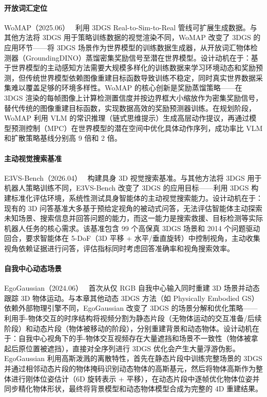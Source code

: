 \paragraph{开放词汇定位}

WoMAP（2025.06）~\cite{2506_01600} 利用 3DGS Real-to-Sim-to-Real 管线可扩展生成数据。与其他方法将 3DGS 用于策略训练数据的视觉渲染不同，WoMAP 改变了 3DGS 的应用环节——将 3DGS 场景作为世界模型的训练数据生成器，从开放词汇物体检测器（GroundingDINO）蒸馏密集奖励信号至潜在世界模型。设计动机在于：基于世界模型的主动感知方法需要大规模多样化的训练数据来学习环境动态和奖励预测，但传统世界模型依赖图像重建目标函数导致训练不稳定，同时真实世界数据采集难以覆盖足够的环境多样性。WoMAP 的核心创新是奖励蒸馏策略——在 3DGS 渲染的每帧图像上计算检测置信度并按边界框大小缩放作为密集奖励信号，替代传统的图像重建目标函数，实现数据高效的奖励预测器训练。在规划阶段，WoMAP 利用 VLM 的常识推理（链式思维提示）生成高层动作提议，再通过模型预测控制（MPC）在世界模型的潜在空间中优化具体动作序列，成功率比 VLM 和扩散策略基线分别高 9 倍和 2 倍。

\paragraph{主动视觉搜索基准}

E3VS-Bench（2026.04）~\cite{2604_17969} 构建具身 3D 视觉搜索基准。与其他方法将 3DGS 用于机器人策略训练不同，E3VS-Bench 改变了 3DGS 的应用目标——利用 3DGS 构建标准化评估环境，系统性测试具身智能体的主动视觉搜索能力。设计动机在于：现有的 3D 问答基准大多基于预给定视角的被动式问答，无法评估智能体主动探索未知场景、搜索信息并回答问题的能力，而这一能力是搜索救援、目标检测等实际机器人任务的核心需求。该基准包含 99 个高保真 3DGS 场景和 2014 个问题驱动回合，要求智能体在 5-DoF（3D 平移 + 水平/垂直旋转）中控制视角，主动收集视角依赖证据进行问答，评估指标同时考虑回答准确率和视角搜索效率。

\paragraph{自我中心动态场景}

EgoGaussian（2024.06）~\cite{2406_19811} 首次从仅 RGB 自我中心输入同时重建 3D 场景并动态跟踪 3D 物体运动。与本章其他动态 3DGS 方法（如 Physically Embodied GS）依赖外部物理引擎不同，EgoGaussian 改变了 3DGS 的场景分解和优化策略——利用手-物体交互的时序结构将视频分割为静态片段（无物体运动的交互准备/后续阶段）和动态片段（物体被移动的阶段），分别重建背景和动态物体。设计动机在于：自我中心视角下的手-物体交互视频存在大量遮挡和场景不一致性（物体被拿起后原位置被遮挡），直接对全序列进行 3DGS 优化会产生大量浮游伪影。EgoGaussian 利用高斯泼溅的离散特性，首先在静态片段中训练完整场景的 3DGS 并通过相邻动态片段的物体掩码识别动态物体的高斯基元，然后将物体高斯作为整体进行刚体位姿估计（6D 旋转表示 + 平移），在动态片段中逐帧优化物体位姿并同步精化物体形状，最终将背景模型和动态物体模型合成为完整的 4D 重建结果。

